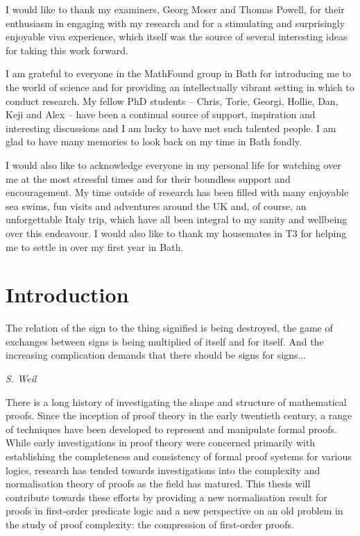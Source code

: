 \documentclass[10pt]{article}
\theoremstyle{definition}\newtheorem{remark}[theorem]{Remark}
\theoremstyle{definition}\newtheorem{example}[theorem]{Example}
\theoremstyle{definition}\newtheorem{definition}[theorem]{Definition}
\begin{document}
	I would like to thank my examiners, Georg Moser and Thomas Powell, for their enthusiasm in engaging with my research and for a stimulating and surprisingly enjoyable viva experience, which itself was the source of several interesting ideas for taking this work forward.
	
 	I am grateful to everyone in the MathFound group in Bath for introducing me to the world of science and for providing an intellectually vibrant setting in which to conduct research. My fellow PhD students – Chris, Torie, Georgi, Hollie, Dan, Keji and Alex – have been a continual source of support, inspiration and interesting discussions and I am lucky to have met such talented people. I am glad to have many memories to look back on my time in Bath fondly.
	
	I would also like to acknowledge everyone in my personal life for watching over me at the most stressful times and for their boundless support and encouragement. My time outside of research has been filled with many enjoyable sea swims, fun visits and adventures around the UK and, of course, an unforgettable Italy trip, which have all been integral to my sanity and wellbeing over this endeavour. I would also like to thank my housemates in T3 for helping me to settle in over my first year in Bath.
	
	
	\pagebreak

	\tableofcontents
	
	\pagebreak
	
	\listoffigures
	
	\pagebreak
	
	\section{Introduction}\label{Introduction}
	
	\epigraph{The relation of the sign to the thing signiﬁed is being destroyed, the game of exchanges between signs is being multiplied of itself and for itself. And the increasing complication demands that there should be signs for signs...}{\textit{S. Weil}}
	
	\noindent
	There is a long history of investigating the shape and structure of mathematical proofs. Since the inception of proof theory in the early twentieth century, a range of techniques have been developed to represent and manipulate formal proofs. While early investigations in proof theory were concerned primarily with establishing the completeness and consistency of formal proof systems for various logics, research has tended towards investigations into the complexity and normalisation theory of proofs as the field has matured. This thesis will contribute towards these efforts by providing a new normalisation result for proofs in first-order predicate logic and a new perspective on an old problem in the study of proof complexity: the compression of first-order proofs.
	
\end{document}
